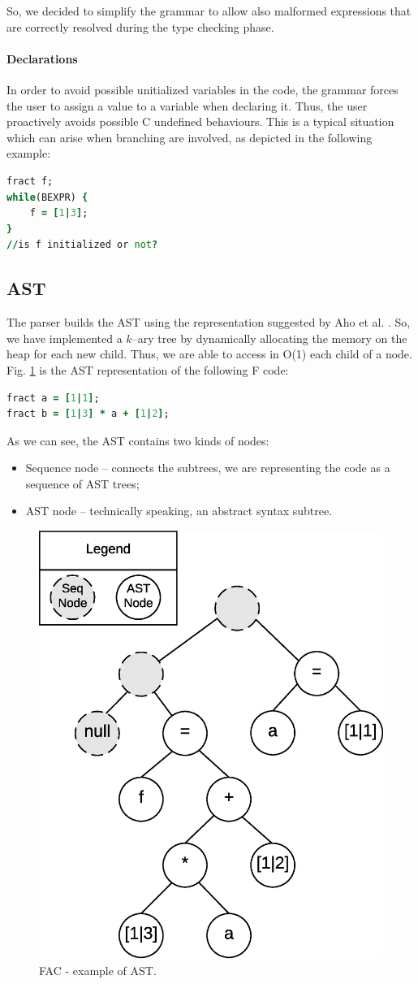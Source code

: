So, we decided to simplify the grammar to allow also malformed expressions that
are correctly resolved during the type checking phase.


\paragraph{Declarations}

In order to avoid possible unitialized variables in the code, the grammar
forces the user to assign a value to a variable when declaring it.
Thus, the user proactively avoids possible C undefined behaviours.
This is a typical situation which can arise
when branching are involved, as depicted in the following example:
\begin{lstlisting}[language=F, caption={Example of possible uninitialized 
variable.},captionpos=b,label=f-code0, frame = single]
fract f;
while(BEXPR) {
    f = [1|3];
}
//is f initialized or not?
\end{lstlisting}

\subsection{AST}
The parser builds the AST using the representation suggested by Aho et al. 
\cite{dragonbook}. So, we have implemented a $k$--ary
tree by dynamically allocating the memory on the heap for each new child. Thus, 
we are able to access in O(1) each child of a node.
Fig. \ref{fig:ast} is the AST representation of the following F code:
\begin{lstlisting}[language=F,caption={Example of F code},captionpos=b,
label=f-code1, frame=single]
fract a = [1|1];
fract b = [1|3] * a + [1|2];
\end{lstlisting}
As we can see, the AST contains two kinds of nodes:
\begin{itemize}
	\item Sequence node -- connects the subtrees, we are representing the 
	code as a sequence of AST trees;
	\item AST node -- technically speaking, an abstract syntax subtree.
\end{itemize}
\begin{figure}[H]
  \centering
  \includegraphics[width=.5\columnwidth]{img/eps/ast.eps}
  \caption{FAC - example of AST.}
  \label{fig:ast}
\end{figure}


